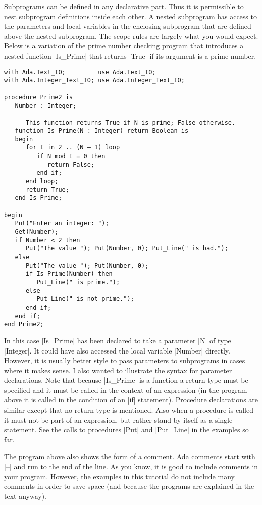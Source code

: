 Subprograms can be defined in any declarative part. Thus it is permissible to nest subprogram
definitions inside each other. A nested subprogram has access to the parameters and local
variables in the enclosing subprogram that are defined above the nested subprogram. The scope
rules are largely what you would expect. Below is a variation of the prime number checking
program that introduces a nested function |Is_Prime| that returns |True| if its argument is a
prime number.

\begin{lstlisting}
with Ada.Text_IO;         use Ada.Text_IO;
with Ada.Integer_Text_IO; use Ada.Integer_Text_IO;

procedure Prime2 is
   Number : Integer;

   -- This function returns True if N is prime; False otherwise.
   function Is_Prime(N : Integer) return Boolean is
   begin
      for I in 2 .. (N – 1) loop
         if N mod I = 0 then
            return False;
         end if;
      end loop;
      return True;
   end Is_Prime;

begin
   Put("Enter an integer: ");
   Get(Number);
   if Number < 2 then
      Put("The value "); Put(Number, 0); Put_Line(" is bad.");
   else
      Put("The value "); Put(Number, 0);
      if Is_Prime(Number) then
         Put_Line(" is prime.");
      else
         Put_Line(" is not prime.");
      end if;
   end if;
end Prime2;
\end{lstlisting}

In this case |Is_Prime| has been declared to take a parameter |N| of type |Integer|. It could
have also accessed the local variable |Number| directly. However, it is usually better style to
pass parameters to subprograms in cases where it makes sense. I also wanted to illustrate the
syntax for parameter declarations. Note that because |Is_Prime| is a function a return type must
be specified and it must be called in the context of an expression (in the program above it is
called in the condition of an |if| statement). Procedure declarations are similar except that no
return type is mentioned. Also when a procedure is called it must not be part of an expression,
but rather stand by itself as a single statement. See the calls to procedures |Put| and
|Put_Line| in the examples so far.

The program above also shows the form of a comment. Ada comments start with |--| and run to the
end of the line. As you know, it is good to include comments in your program. However, the
examples in this tutorial do not include many comments in order to save space (and because the
programs are explained in the text anyway).

